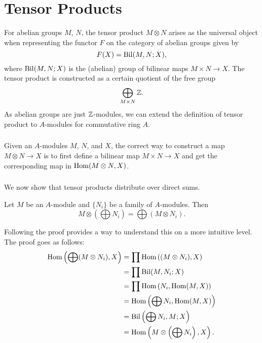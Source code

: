 \section{Tensor Products}
For abelian groups $M$, $N$, the tensor product $M \otimes N$ arises as the universal object when representing the functor $F$ on the category of abelian groups given by
\[
    F(X) = \operatorname{Bil}(M, N; X),
\]
where $\operatorname{Bil}(M, N; X)$ is the (abelian) group of bilinear maps $M \times N \rightarrow X$. The tensor product is constructed as a certain quotient of the free group
\[
    \bigoplus_{M \times N} {\mathbb Z}.
\]
As abelian groups are just ${\mathbb Z}$-modules, we can extend the definition of tensor product to $A$-modules for commutative ring $A$.

\subsubsection{}
\label{tensor-map-construction}
Given an $A$-modules $M$, $N$, and $X$, the correct way to construct a map $M \otimes N \rightarrow X$ is to first define a bilinear map $M \times N \rightarrow X$ and get the corresponding map in $\operatorname{Hom}(M \otimes N, X)$.

\subsubsection{}
We now show that tensor products distribute over direct sums.
\begin{thm}
    Let $M$ be an $A$-module and $\{N_i\}$ be a family of $A$-modules. Then
    \[
        M \otimes \left(\bigoplus N_i\right) = \bigoplus (M \otimes N_i).
    \]
\end{thm}
Following the proof provides a way to understand this on a more intuitive level. The proof goes as follows:
\[
    \begin{split}
        \operatorname{Hom}\left(\bigoplus (M \otimes N_i), X \right) &= \prod \operatorname{Hom}\left((M \otimes N_i), X\right)\\
                                                       &= \prod \operatorname{Bil}(M, N_i; X)\\
                                                       &= \prod \operatorname{Hom}\left(N_i, \operatorname{Hom}(M, X) \right)\\
                                                       &= \operatorname{Hom}\left(\bigoplus N_i, \operatorname{Hom}(M, X)\right)\\
                                                       &= \operatorname{Bil}\left(\bigoplus N_i, M; X\right)\\
                                                       &= \operatorname{Hom}\left(M \otimes \left(\bigoplus N_i\right), X\right).
    \end{split}
\]
